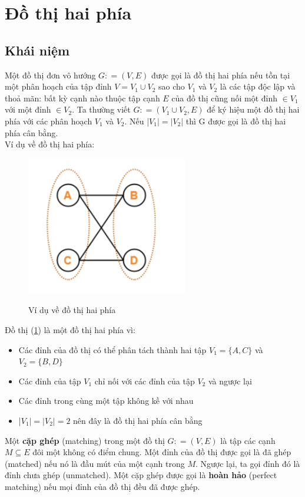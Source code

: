\documentclass[a4paper, 12pt]{report}
\begin{document}
\section{Đồ thị hai phía}
\subsection{Khái niệm}
Một đồ thị đơn vô hướng $G: = (V,E)$ được gọi là đồ thị hai phía nếu tồn tại một phân hoạch của tập đỉnh $V=V_1 \cup V_2$ sao cho $V_{1}$ và $V_{2}$ là các tập độc lập và thoả mãn: bất kỳ cạnh nào thuộc tập cạnh $E$ của đồ thị cũng nối một đỉnh $\in V_1$ với một đỉnh $\in V_2$.  Ta thường viết $G: = (V_{1} \cup V_{2},E)$ để ký hiệu một đồ thị hai phía với các phân hoạch $V_1$ và $V_2$. Nếu |$ V_{1} | = | V_{2} |$ thì G được gọi là đồ thị hai phía cân bằng. \\
Ví dụ về đồ thị hai phía: 
\begin{figure}
\begin{center}
	\includegraphics[width=7cm]{ex1}\\
 	\caption{Ví dụ về đồ thị hai phía}
	\label{fig:t}
\end{center}
\end{figure}
Đồ thị (\ref{fig:t}) là một đồ thị hai phía vì:
\begin{itemize}
	\item Các đỉnh của đồ thị có thể phân tách thành hai tập $V_1=\{A,C\}$ và $V_2=\{B,D\}$ 
	\item Các đỉnh của tập $V_1$ chỉ nối với các đỉnh của tập $V_2$ và ngược lại
	\item Các đỉnh trong cùng một tập không kề với nhau 
	\item |$ V_{1} | = | V_{2} | =2$ nên đây là đồ thị hai phía cân bằng
\end{itemize}

Một \textbf{cặp ghép} (matching) trong một đồ thị $G: = (V,E)$ là tập các cạnh $M \subseteq E$ đôi một không có điểm chung. Một đỉnh của đồ thị được gọi là đã ghép (matched) nếu nó là đầu mút của một cạnh trong $M$. Ngược lại, ta gọi đỉnh đó là đỉnh chưa ghép (unmatched). Một cặp ghép được gọi là \textbf{hoàn hảo} (perfect matching) nếu mọi đỉnh của đồ thị đều đã được ghép.
\end{document}
